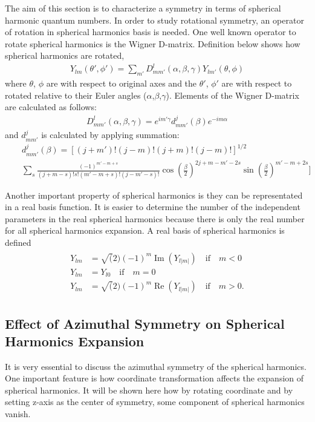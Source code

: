 The aim of this section is to characterize a symmetry in terms of spherical harmonic quantum numbers. In order to study rotational symmetry, an operator of rotation in spherical harmonics basis is needed. One well known operator to rotate spherical harmonics is the Wigner D-matrix. Definition below shows how spherical harmonics are rotated,
\begin{eqnarray}
Y_{lm}(\theta',\phi')=\sum_{m'}D^{l}_{mm'}(\alpha,\beta,\gamma)Y_{lm'}(\theta,\phi)
\end{eqnarray} 
where $\theta$, $\phi$ are with respect to original axes and the $\theta'$, $\phi'$ are with respect to rotated relative to their Euler angles ($\alpha$,$\beta$,$\gamma$). Elements of the Wigner D-matrix are calculated as follows:
\begin{eqnarray}
D^{l}_{mm'}(\alpha,\beta,\gamma)=e^{im'\gamma}d^{j}_{mm'}(\beta)e^{-im\alpha}
\end{eqnarray}
and $d^{j}_{mm'}$ is calculated by applying summation:
\begin{eqnarray}
&&d^{j}_{mm'}(\beta)=[(j+m')!(j-m)!(j+m)!(j-m)!]^{1/2}\\ \nonumber
&&\sum_{s}\frac{(-1)^{m'-m+s}}{(j+m-s)!s!(m'-m+s)!(j-m'-s)!} \cos(\frac{\beta}{2})^{2j+m-m'-2s} \sin(\frac{\beta}{2})^{m'-m+2s} ]
\end{eqnarray}

Another important property of spherical harmonics is they can be representated in a real basis function. It is easier to determine the number of the independent parameters in the real spherical harmonics because there is only the real number for all spherical harmonics expansion. A real basis of spherical harmonics is defined
\begin{align}
\begin{split}
Y_{lm}&=\sqrt(2)(-1)^{m} \operatorname{Im}(Y_{l|m|}) \quad \mbox{if} \quad m<0 \\
Y_{lm}&=Y_{l0} \quad \mbox{if} \quad m=0 \\
Y_{lm}&=\sqrt(2)(-1)^{m} \operatorname{Re}(Y_{l|m|}) \quad \mbox{if} \quad m>0. 
\end{split}
\label{eq:realsph}
\end{align} 

\subsection{Effect of Azimuthal Symmetry on Spherical Harmonics Expansion}
\label{subsec:azimsym}
It is very essential to discuss the azimuthal symmetry of the spherical harmonics. One important feature is how coordinate transformation affects the expansion of spherical harmonics. It will be shown here how by rotating coordinate and by setting z-axis as the center of symmetry, some component of spherical harmonics vanish.


